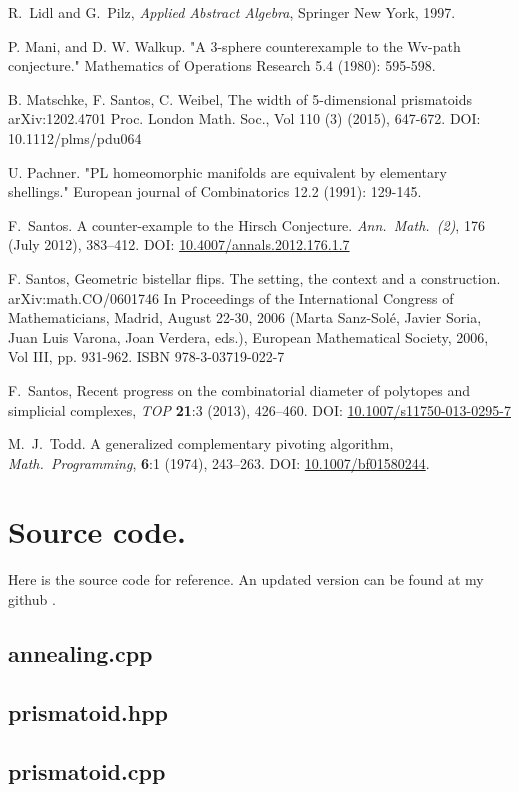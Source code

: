 \documentclass[12pt,a4paper]{article}
\theoremstyle{plain}
\theoremstyle{definition}
\begin{document}
\begin{thebibliography}{99}
R.~Lidl and G.~Pilz,
 \emph{Applied Abstract Algebra},
 Springer New York, 1997.

  P. Mani, and D. W. Walkup. "A 3-sphere counterexample to the Wv-path conjecture." Mathematics of Operations Research 5.4 (1980): 595-598.

B. Matschke, F. Santos, C. Weibel, The width of 5-dimensional prismatoids
arXiv:1202.4701
Proc. London Math. Soc., Vol 110 (3) (2015), 647-672. DOI: 10.1112/plms/pdu064

  U. Pachner. "PL homeomorphic manifolds are equivalent by elementary shellings." European journal of Combinatorics 12.2 (1991): 129-145.

  F.~Santos.
  A counter-example to the Hirsch Conjecture.
  \emph{Ann.~Math.~(2)}, 176 (July 2012), 383--412. 
  DOI: \href{http://dx.doi.org/10.4007/annals.2012.176.1.7}{10.4007/annals.2012.176.1.7}

F. Santos, Geometric bistellar flips. The setting, the context and a construction.
arXiv:math.CO/0601746
In Proceedings of the International Congress of Mathematicians, Madrid, August 22-30, 2006 (Marta Sanz-Solé, Javier Soria, Juan Luis Varona, Joan Verdera, eds.), European Mathematical Society, 2006, Vol III, pp. 931-962. ISBN 978-3-03719-022-7 

F.~Santos, Recent progress on the combinatorial diameter of polytopes and simplicial complexes,
\emph{TOP} {\bf 21}:3 (2013), 426--460. 
DOI: \href{http://dx.doi.org/10.1007/s11750-013-0295-7}{10.1007/s11750-013-0295-7}

M.~J.~Todd.
A generalized complementary pivoting algorithm,
\emph{Math.~Programming}, {\bf 6}:1 (1974), 243--263.
DOI:  \href{http://dx.doi.org/10.1007/BF01580244}{10.1007/bf01580244}.

\end{thebibliography}

\newpage
\appendix
\section{Source code.}
Here is the source code for reference. An updated version can be found at my github \cite{github}.
\subsection{annealing.cpp}

\subsection{prismatoid.hpp}

\subsection{prismatoid.cpp}

\end{document}
